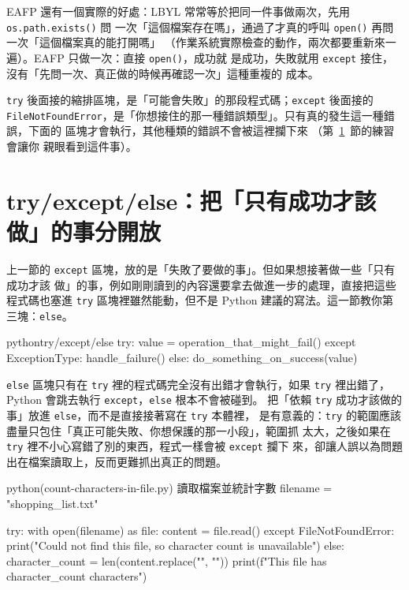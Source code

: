 EAFP 還有一個實際的好處：LBYL 常常等於把同一件事做兩次，先用 \texttt{os.path.exists()} 問
一次「這個檔案存在嗎」，通過了才真的呼叫 \texttt{open()} 再問一次「這個檔案真的能打開嗎」
（作業系統實際檢查的動作，兩次都要重新來一遍）。EAFP 只做一次：直接 \texttt{open()}，成功就
是成功，失敗就用 \texttt{except} 接住，沒有「先問一次、真正做的時候再確認一次」這種重複的
成本。

\texttt{try} 後面接的縮排區塊，是「可能會失敗」的那段程式碼；\texttt{except} 後面接的
\texttt{FileNotFoundError}，是「你想接住的那一種錯誤類型」。只有真的發生這一種錯誤，下面的
區塊才會執行，其他種類的錯誤不會被這裡攔下來
（第~\ref{sec:try-except-else}~節的練習會讓你
親眼看到這件事）。


\section{try/except/else：把「只有成功才該做」的事分開放}
\label{sec:try-except-else}

上一節的 \texttt{except} 區塊，放的是「失敗了要做的事」。但如果想接著做一些「只有成功才該
做」的事，例如剛剛讀到的內容還要拿去做進一步的處理，直接把這些程式碼也塞進 \texttt{try}
區塊裡雖然能動，但不是 Python 建議的寫法。這一節教你第三塊：\texttt{else}。

\begin{code}{python}{try/except/else}
try:
    value = operation_that_might_fail()
except ExceptionType:
    handle_failure()
else:
    do_something_on_success(value)
\end{code}

\texttt{else} 區塊只有在 \texttt{try} 裡的程式碼完全沒有出錯才會執行，如果 \texttt{try}
裡出錯了，Python 會跳去執行 \texttt{except}，\texttt{else} 根本不會被碰到。
把「依賴
\texttt{try} 成功才該做的事」放進 \texttt{else}，而不是直接接著寫在 \texttt{try} 本體裡，
是有意義的：\texttt{try} 的範圍應該盡量只包住「真正可能失敗、你想保護的那一小段」，範圍抓
太大，之後如果在 \texttt{try} 裡不小心寫錯了別的東西，程式一樣會被 \texttt{except} 攔下
來，卻讓人誤以為問題出在檔案讀取上，反而更難抓出真正的問題。

\begin{example}{python}{(count-characters-in-file.py) 讀取檔案並統計字數}
filename = "shopping_list.txt"

try:
    with open(filename) as file:
        content = file.read()
except FileNotFoundError:
    print("Could not find this file, so character count is unavailable")
else:
    character_count = len(content.replace("\n", ""))
    print(f"This file has {character_count} characters")
\end{example}

